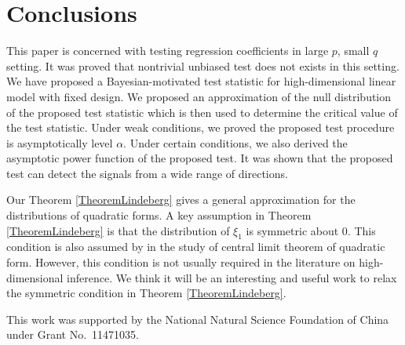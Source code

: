 \documentclass[smallextended]{svjour3}       %
\begin{document}
\section{Conclusions}\label{sec:conclusions}
This paper is concerned with testing regression coefficients in large $p$, small $q$ setting.
It was proved that nontrivial unbiased test does not exists in this setting.
We have proposed a Bayesian-motivated test statistic for high-dimensional linear model with fixed design.
We proposed an approximation of the null distribution of the proposed test statistic which is then used to determine the critical value of the test statistic.
Under weak conditions, we proved the proposed test procedure is asymptotically level $\alpha$.
Under certain conditions, we also derived the asymptotic power function of the proposed test.
It was shown that the proposed test can detect the signals from a wide range of directions.

%
Our Theorem \ref{TheoremLindeberg} gives a general approximation for the distributions of quadratic forms.
A key assumption in Theorem \ref{TheoremLindeberg} is that the distribution of $\xi_1$ is symmetric about $0$. 
This condition is also assumed by \cite{Bai2017} in the study of central limit theorem of quadratic form.
However, this condition is not usually required in the literature on high-dimensional inference.
We think it will be an interesting and useful work to relax the symmetric condition in Theorem \ref{TheoremLindeberg}.






\begin{acknowledgements}
This work was supported by the National Natural Science Foundation of China under Grant No.\ 11471035.
\end{acknowledgements}
\end{document}
